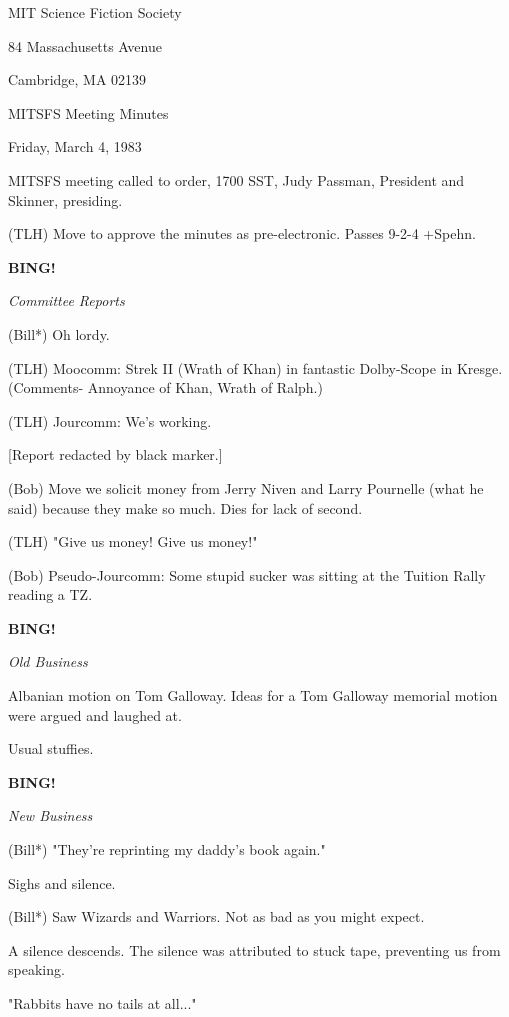 \documentclass[12pt]{article}
\newcommand{\bing}{{\bf BING!} }
\newcommand{\goto}[1]{\bing \vskip 12pt \centerline{{\em{#1}}}}
\begin{document}
\begin{center}

MIT Science Fiction Society 

84 Massachusetts Avenue

Cambridge, MA 02139

\vspace{12pt}

MITSFS Meeting Minutes 

Friday, March 4, 1983

\end{center}
 
\vspace{18pt}

\setlength{\parskip}{6pt}

\noindent
MITSFS meeting called to order, 1700 SST,
Judy Passman, President and Skinner, presiding.

(TLH) Move to approve the minutes as pre-electronic. Passes 9-2-4 +Spehn.

\goto{Committee Reports}

(Bill*) Oh lordy.

(TLH) Moocomm: Strek II (Wrath of Khan) in fantastic Dolby-Scope in Kresge. (Comments- Annoyance of Khan, Wrath of Ralph.)

(TLH) Jourcomm: We's working.

[Report redacted by black marker.]

(Bob) Move we solicit money from Jerry Niven and Larry Pournelle (what he said) because they make so much. Dies for lack of second.

(TLH) "Give us money! Give us money!"

(Bob) Pseudo-Jourcomm: Some stupid sucker was sitting at the Tuition Rally reading a TZ.

\goto{Old Business}

Albanian motion on Tom Galloway. Ideas for a Tom Galloway memorial motion were argued and laughed at.

Usual stuffies.

\goto{New Business}

(Bill*) "They're reprinting my daddy's book again."

Sighs and silence.

(Bill*) Saw Wizards and Warriors. Not as bad as you might expect.

A silence descends. The silence was attributed to stuck tape, preventing us from speaking.

"Rabbits have no tails at all..."
\end{document}
